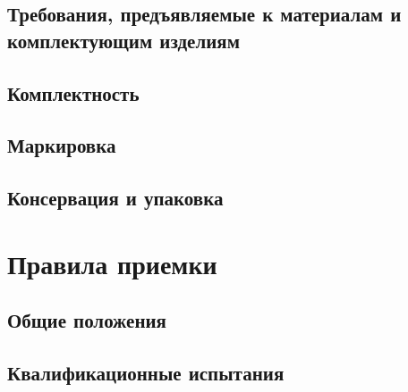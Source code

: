 \documentclass[columnsxxiv,columnsxxvii,pointsubsection]{eskdtext}
\begin{document}
	\subsection{Требования, предъявляемые к материалам и комплектующим изделиям}
	\point
	\label{t_smp}
	
	
%	
%	
%	
%	
	
	\subsection{Комплектность}
	\point
	\label{t_komp}
	
	
	\newpage
	\subsection{Маркировка}
	\point
	\label{t_mar_ms}
	
	\point
	\label{t_mar_mar}
	
	
%	
	
	\subsection{Консервация и упаковка}
	\point
	\label{t_up1}
	
	\point
	\label{t_up2}
	
%	
	
	\newpage
	\section{Правила приемки}
	
	\subsection{Общие положения}
	\label{prav_op}
	
	
	\subsection{Квалификационные испытания}
	\label{prav_kv}
	
	
\end{document}
